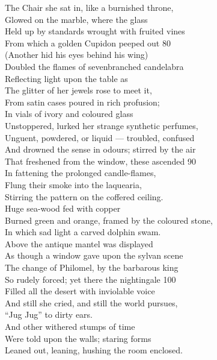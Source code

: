 \documentclass{article}
\begin{document}
The Chair she sat in, like a burnished throne, \\
Glowed on the marble, where the glass \\
Held up by standards wrought with fruited vines \\
From which a golden Cupidon peeped out                           \hfill 80 \\
(Another hid his eyes behind his wing) \\
Doubled the flames of sevenbranched candelabra \\
Reflecting light upon the table as \\
The glitter of her jewels rose to meet it, \\
From satin cases poured in rich profusion; \\
In vials of ivory and coloured glass \\
Unstoppered, lurked her strange synthetic perfumes, \\
Unguent, powdered, or liquid --- troubled, confused \\
And drowned the sense in odours; stirred by the air \\
That freshened from the window, these ascended                   \hfill 90 \\
In fattening the prolonged candle-flames, \\
Flung their smoke into the laquearia, \\
Stirring the pattern on the coffered ceiling. \\
Huge sea-wood fed with copper \\
Burned green and orange, framed by the coloured stone, \\
In which sad light a carved dolphin swam. \\
Above the antique mantel was displayed \\
As though a window gave upon the sylvan scene \\
The change of Philomel, by the barbarous king \\
So rudely forced; yet there the nightingale                      \hfill  100 \\
Filled all the desert with inviolable voice \\
And still she cried, and still the world pursues, \\
``Jug Jug'' to dirty ears. \\
And other withered stumps of time \\
Were told upon the walls; staring forms \\
Leaned out, leaning, hushing the room enclosed. \\
\end{document}
